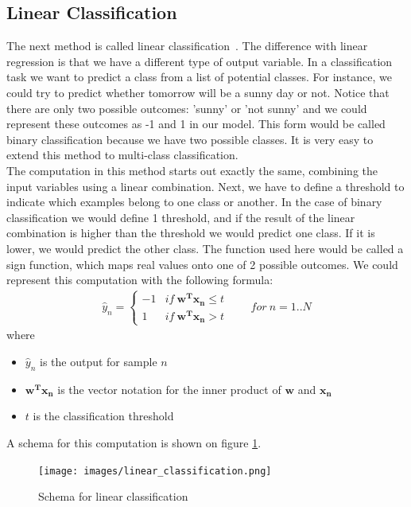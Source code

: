 \subsection{Linear Classification}
\label{subsec:glm-linear-classification}
The next method is called linear classification~\cite{caltechmachinelearning}\cite{wikiclassification}. The difference with linear regression is that we have a different type of output variable. In a classification task we want to predict a class from a list of potential classes. For instance, we could try to predict whether tomorrow will be a sunny day or not. Notice that there are only two possible outcomes: 'sunny' or 'not sunny' and we could represent these outcomes as -1 and 1 in our model. This form would be called binary classification because we have two possible classes. It is very easy to extend this method to multi-class classification.\\
The computation in this method starts out exactly the same, combining the input variables using a linear combination. Next, we have to define a threshold to indicate which examples belong to one class or another. In the case of binary classification we would define 1 threshold, and if the result of the linear combination is higher than the threshold we would predict one class. If it is lower, we would predict the other class. The function used here would be called a sign function, which maps real values onto one of 2 possible outcomes. We could represent this computation with the following formula: 
\begin{equation}
\begin{split}
\hat{y}_{n} =
\begin{cases} 
-1 & if\ \bm{w^{T}x_{n}} \leq t \\
1 & if\ \bm{w^{T}x_{n}} > t 
\end{cases}
\qquad for\ n=1..N
\end{split}
\end{equation}
where
\begin{itemize}
	\item $\hat{y}_{n}$ is the output for sample $n$
	\item $\bm{w^{T}x_{n}}$ is the vector notation for the inner product of $\bm{w}$ and $\bm{x_{n}}$
	\item $t$ is the classification threshold
\end{itemize}
A schema for this computation is shown on figure \ref{fig:glm-linear-classification}.
\begin{figure}
	\centering
	\texttt{[image: images/linear\_classification.png]}
	\caption{Schema for linear classification}
	\label{fig:glm-linear-classification}
\end{figure}
